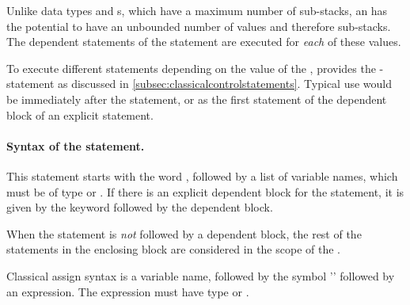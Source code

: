 Unlike data types and s, which have a maximum number of 
sub-stacks, an  has the potential to have 
 an unbounded number of values and therefore sub-stacks. 
The dependent statements of
 the  statement are executed for \emph{each} 
of these values.

To execute different statements depending on the value of 
the , \lqpl{}
provides the  -  statement as discussed in
\vref{subsec:classicalcontrolstatements}. Typical use would be immediately
after the  statement, or as the first statement of
the dependent block of an explicit  statement.

\paragraph{Syntax of the  statement.} This statement starts with 
the word ,
 followed by a list of variable names, which must be  of
type  or . If there is an 
explicit dependent block for the statement, it is given by the
keyword  followed by the dependent block.

When the  statement is \emph{not} followed by a dependent block, 
the rest of the statements in the enclosing block are considered in
the scope of the .

Classical assign syntax is a variable name, followed by the 
symbol '\inlqpl{:=}' followed by an expression. The expression must have
type  or . 

